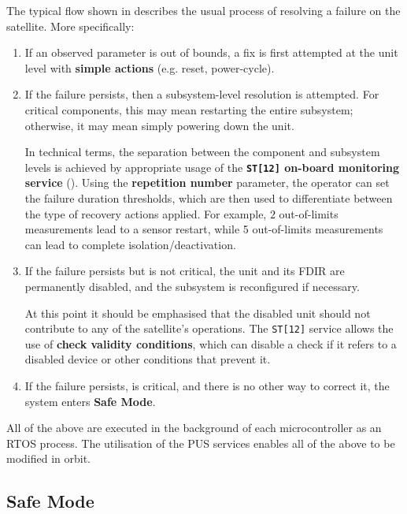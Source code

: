 \documentclass[a4paper,nobib]{tufte-book}
\begin{document}
The typical flow shown in  describes the usual process of resolving a failure on the satellite. More specifically:
\begin{enumerate}
	\item If an observed parameter is out of bounds, a fix is first attempted at the unit level with \textbf{simple actions} (e.g. reset, power-cycle).
	\item If the failure persists, then a subsystem-level resolution is attempted. For critical components, this may mean restarting the entire subsystem; otherwise, it may mean simply powering down the unit.
	
	In technical terms, the separation between the component and subsystem levels is achieved by appropriate usage of the \textbf{\texttt{ST[12]} on-board monitoring service} (). Using the \textbf{repetition number} parameter, the operator can set the failure duration thresholds, which are then used to differentiate between the type of recovery actions applied. For example, \( 2 \) out-of-limits measurements lead to a sensor restart, while 5 out-of-limits measurements can lead to complete isolation/deactivation.
	\item If the failure persists but is not critical, the unit and its \acs{FDIR} are permanently disabled, and the subsystem is reconfigured if necessary.
	
	At this point it should be emphasised that the disabled unit should not contribute to any of the satellite's operations. The \texttt{ST[12]} service allows the use of \textbf{check validity conditions}, which can disable a check if it refers to a disabled device or other conditions that prevent it.
	\item If the failure persists, is critical, and there is no other way to correct it, the system enters \textbf{Safe Mode}.
\end{enumerate}

All of the above are executed in the background of each microcontroller as an \acs{RTOS} process. The utilisation of the \acs{PUS} services enables all of the above to be modified in orbit.

\subsection{Safe Mode}
\label{itm:safe_mode}
\end{document}
